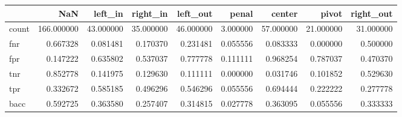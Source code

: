 \begin{tabular}{lrrrrrrrr}
\toprule
{} &         NaN &    left\_in &   right\_in &   left\_out &     penal &     center &      pivot &  right\_out \\
\midrule
count &  166.000000 &  43.000000 &  35.000000 &  46.000000 &  3.000000 &  57.000000 &  21.000000 &  31.000000 \\
fnr   &    0.667328 &   0.081481 &   0.170370 &   0.231481 &  0.055556 &   0.083333 &   0.000000 &   0.500000 \\
fpr   &    0.147222 &   0.635802 &   0.537037 &   0.777778 &  0.111111 &   0.968254 &   0.787037 &   0.470370 \\
tnr   &    0.852778 &   0.141975 &   0.129630 &   0.111111 &  0.000000 &   0.031746 &   0.101852 &   0.529630 \\
tpr   &    0.332672 &   0.585185 &   0.496296 &   0.546296 &  0.055556 &   0.694444 &   0.222222 &   0.277778 \\
bacc  &    0.592725 &   0.363580 &   0.257407 &   0.314815 &  0.027778 &   0.363095 &   0.055556 &   0.333333 \\
\bottomrule
\end{tabular}

